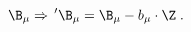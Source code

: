 \begin{equation}
\label{e5:16}
\B_{\mu} \Rightarrow \, '\B_{\mu}=\B_{\mu} - b_{\mu}\cdot \Z \; .
\end{equation}

